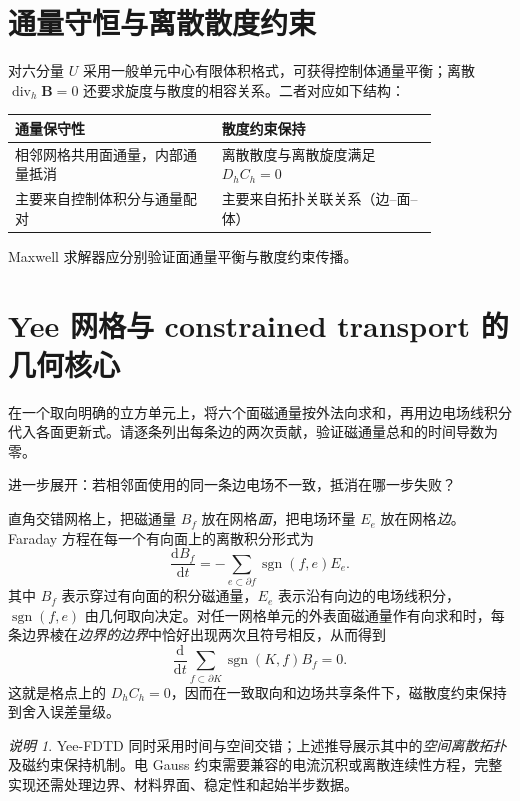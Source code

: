 \documentclass[UTF8,11pt,openany]{ctexbook}
\numberwithin{equation}{chapter}
\theoremstyle{definition}
\theoremstyle{remark}
\newtheorem{remark}[theorem]{说明}
\newcommand{\dd}{\mathrm d}
\newcommand{\Div}{\operatorname{div}}
\begin{document}
\section{通量守恒与离散散度约束}
对六分量 $U$ 采用一般单元中心有限体积格式，可获得控制体通量平衡；离散 $\Div_h\bm B=0$ 还要求旋度与散度的相容关系。二者对应如下结构：
\begin{center}
\begin{tabular}{p{0.41\linewidth}p{0.43\linewidth}}
\toprule
通量保守性 & 散度约束保持\\
\midrule
相邻网格共用面通量，内部通量抵消 & 离散散度与离散旋度满足 $D_hC_h=0$\\
主要来自控制体积分与通量配对 & 主要来自拓扑关联关系（边--面--体）\\
\bottomrule
\end{tabular}
\end{center}
Maxwell 求解器应分别验证面通量平衡与散度约束传播。

\section{Yee 网格与 constrained transport 的几何核心}
\begin{askai}
在一个取向明确的立方单元上，将六个面磁通量按外法向求和，再用边电场线积分代入各面更新式。请逐条列出每条边的两次贡献，验证磁通量总和的时间导数为零。

进一步展开：若相邻面使用的同一条边电场不一致，抵消在哪一步失败？
\end{askai}
直角交错网格上，把磁通量 $B_f$ 放在网格\emph{面}，把电场环量 $E_e$ 放在网格\emph{边}。Faraday 方程在每一个有向面上的离散积分形式为
\begin{equation}\label{eq:CT}
\frac{\dd B_f}{\dd t}=-\sum_{e\subset\partial f}\operatorname{sgn}(f,e)E_e.
\end{equation}
其中 $B_f$ 表示穿过有向面的积分磁通量，$E_e$ 表示沿有向边的电场线积分，$\operatorname{sgn}(f,e)$ 由几何取向决定。对任一网格单元的外表面磁通量作有向求和时，每条边界棱在\emph{边界的边界}中恰好出现两次且符号相反，从而得到
\begin{equation}\label{eq:dd0discrete}
\frac{\dd}{\dd t}\sum_{f\subset\partial K}\operatorname{sgn}(K,f)B_f=0.
\end{equation}
这就是格点上的 $D_hC_h=0$，因而在一致取向和边场共享条件下，磁散度约束保持到舍入误差量级。

\begin{remark}
Yee-FDTD 同时采用时间与空间交错；上述推导展示其中的\emph{空间离散拓扑}及磁约束保持机制。电 Gauss 约束需要兼容的电流沉积或离散连续性方程，完整实现还需处理边界、材料界面、稳定性和起始半步数据。
\end{remark}
\end{document}
